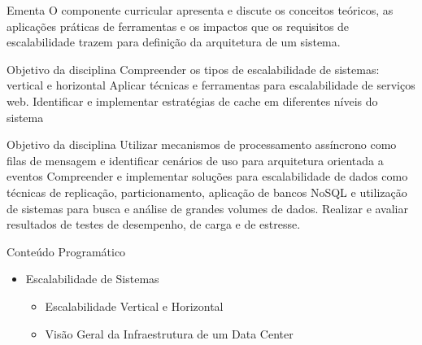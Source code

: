 \documentclass{beamer}
\begin{document}
\begin{frame}{Ementa}\justifying
      O componente curricular apresenta e discute os conceitos teóricos, as aplicações práticas
de ferramentas e os impactos que os requisitos de escalabilidade trazem para definição da
arquitetura de um sistema.
\end{frame}

\begin{frame}{Objetivo da disciplina}\justifying
      Compreender os tipos de escalabilidade de sistemas: vertical e horizontal\newline
      \newline
      Aplicar técnicas e
      ferramentas para escalabilidade de serviços web.\newline
      \newline
      Identificar e implementar estratégias de cache em diferentes níveis do sistema
\end{frame}

\begin{frame}{Objetivo da disciplina}\justifying
      Utilizar mecanismos de processamento assíncrono
      como filas de mensagem e identificar cenários de uso para arquitetura orientada a eventos \newline
      \newline
      Compreender e implementar soluções para escalabilidade de dados como técnicas de
replicação, particionamento, aplicação de bancos NoSQL e utilização de sistemas para
busca e análise de grandes volumes de dados.\newline
      \newline
      Realizar e avaliar resultados de testes de
      desempenho, de carga e de estresse.
      
\end{frame}

\begin{frame}{Conteúdo Programático}\justifying
      \begin{itemize}
            \item Escalabilidade de Sistemas
                  \begin{itemize}
                        \item Escalabilidade Vertical e Horizontal
                        \item Visão Geral da Infraestrutura de um Data Center
                  \end{itemize}
            
            
      \end{itemize}
\end{frame}
\end{document}
